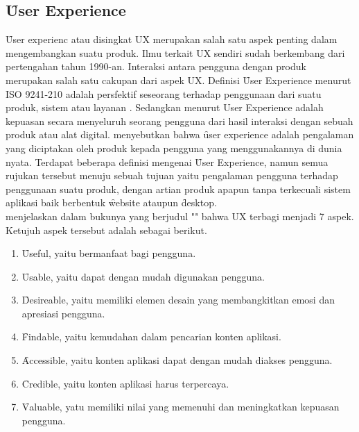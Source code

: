 \subsection{\f{User Experience}}
\f{User experienc} atau disingkat UX merupakan salah satu aspek penting dalam mengembangkan suatu produk. Ilmu terkait UX sendiri sudah berkembang dari pertengahan tahun 1990-an. Interaksi antara pengguna dengan produk merupakan salah satu cakupan dari aspek UX. Definisi \f{User Experience} menurut ISO 9241-210 adalah persfektif seseorang terhadap penggunaan dari suatu produk, sistem atau layanan \citet{}. Sedangkan menurut \citet{} User Experience adalah kepuasan secara menyeluruh seorang pengguna dari hasil interaksi dengan sebuah produk atau alat digital. \citet{} menyebutkan bahwa \f{user experience} adalah pengalaman yang diciptakan oleh produk kepada pengguna yang menggunakannya di dunia nyata.
Terdapat beberapa definisi mengenai \f{User Experience}, namun semua rujukan tersebut menuju sebuah tujuan yaitu pengalaman pengguna terhadap penggunaan suatu produk, dengan artian produk apapun tanpa terkecuali sistem aplikasi baik berbentuk \f{website} ataupun \f{desktop}.
\newline\\
\citet{} menjelaskan dalam bukunya yang berjudul "" bahwa UX terbagi menjadi 7 aspek. Ketujuh aspek tersebut adalah sebagai berikut.
\begin{enumerate}
	\item \f{Useful}, yaitu bermanfaat bagi pengguna.
	\item \f{Usable}, yaitu dapat dengan mudah digunakan pengguna.
	\item \f{Desireable}, yaitu memiliki elemen desain yang membangkitkan emosi dan apresiasi pengguna.
	\item \f{Findable}, yaitu kemudahan dalam pencarian konten aplikasi.
	\item \f{Accessible}, yaitu konten aplikasi dapat dengan mudah diakses pengguna. 
	\item \f{Credible}, yaitu konten aplikasi harus terpercaya.
	\item \f{Valuable}, yatu memiliki nilai yang memenuhi dan meningkatkan kepuasan pengguna.
\end{enumerate}
